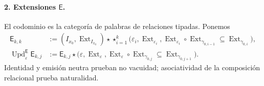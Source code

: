 \paragraph{2. Extensiones \(\mathsf E\).}
El codominio es la categoría de palabras de relaciones tipadas. Ponemos
\begin{align}
 \mathsf E_{k,k}
 &:=(I_{x_0},\operatorname{Ext}_{I_{x_0}})\star
 \mathop{\star}_{i=1}^{k}
 \bigl(\varepsilon_i,\operatorname{Ext}_{\varepsilon_i},
 \operatorname{Ext}_{\varepsilon_i}\circ
 \operatorname{Ext}_{\gamma_{0,i-1}}
 \subseteq\operatorname{Ext}_{\gamma_{0,i}}\bigr),
 \label{rm:eq:pdfv2-terminal-semilla-e}\\
 \operatorname{Upd}^{\mathsf E}_{\varepsilon}\mathsf E_{k,j}
 &:=
 \mathsf E_{k,j}\star
 \bigl(\varepsilon,\operatorname{Ext}_{\varepsilon},
 \operatorname{Ext}_{\varepsilon}\circ
 \operatorname{Ext}_{\gamma_{0,j}}
 \subseteq\operatorname{Ext}_{\gamma_{0,j+1}}\bigr).
 \label{rm:eq:pdfv2-terminal-update-e}
\end{align}
Identidad y emisión neutra prueban no vacuidad; asociatividad de la
composición relacional prueba naturalidad.

